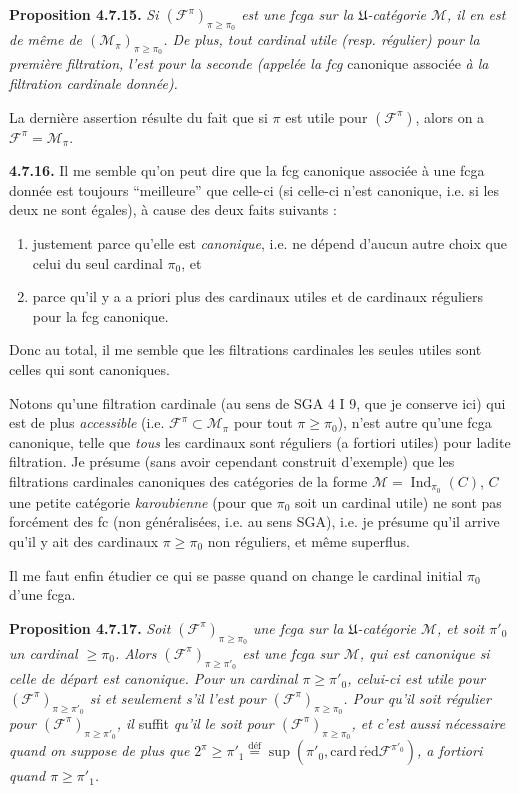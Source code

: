 \documentclass[11pt]{article}
\newcommand{\printedpage}[1]{\marginpar{\footnotesize p.~#1}}
\newcommand{\msp}[1]{\marginpar{\footnotesize [#1]}}
\newcommand{\Ind}{\operatorname{Ind}}
\newcommand{\cardred}{\operatorname{card\,r\acute{e}d}}
\begin{document}
\textbf{Proposition 4.7.15.} \textit{Si $(\mathcal{F}^{\pi})_{\pi\geqslant\pi_0}$ est une fcga sur la $\mathfrak{U}$-catégorie $\mathcal{M}$, il en est de même de $(\mathcal{M}_\pi)_{\pi\geqslant\pi_0}$. De plus, tout cardinal utile (resp. régulier) pour la première filtration, l'est pour la seconde (appelée la fcg} canonique associée \textit{à la filtration cardinale} \textit{donnée).}

La dernière assertion résulte du fait que si $\pi$ est utile pour $(\mathcal{F}^{\pi})$, alors on a $\mathcal{F}^{\pi}=\mathcal{M}_\pi$.

\textbf{4.7.16.} Il me semble qu'on peut dire que la fcg canonique associée à une fcga donnée
\msp{page 181}
est toujours ``meilleure'' que celle-ci (si celle-ci n'est canonique, i.e. si les deux ne sont égales), à cause des deux faits suivants :
\begin{enumerate}[label=\alph*)]
\item justement parce qu'elle est \textit{canonique}, i.e. ne dépend d'aucun autre choix que celui du seul cardinal $\pi_0$, et
\item parce qu'il y a a priori plus des cardinaux utiles et de cardinaux réguliers pour la fcg canonique.
\end{enumerate}
Donc au total, il me semble que les filtrations cardinales les seules utiles sont celles qui sont canoniques.

\noindent\printedpage{62}
Notons qu'une filtration cardinale (au sens de SGA 4 I 9, que je conserve ici) qui est de plus \textit{accessible} (i.e. $\mathcal{F}^{\pi}\subset\mathcal{M}_\pi$ pour tout $\pi\geqslant\pi_0$), n'est autre qu'une fcga canonique, telle que \textit{tous} les cardinaux sont réguliers (a fortiori utiles) pour ladite filtration. Je présume (sans avoir cependant construit d'exemple) que les filtrations cardinales canoniques des catégories de la forme $\mathcal{M}=\Ind_{\pi_0}(C)$, $C$ une petite catégorie \textit{karoubienne} (pour que $\pi_0$ soit un cardinal utile) ne sont pas forcément des fc (non généralisées, i.e. au sens SGA), i.e. je présume qu'il arrive qu'il y ait des cardinaux $\pi\geqslant\pi_0$ non réguliers, et même superflus.

\noindent\msp{page 182}Il me faut enfin étudier ce qui se passe quand on change le cardinal initial $\pi_0$ d'une fcga.

\textbf{Proposition 4.7.17.} \textit{Soit $(\mathcal{F}^{\pi})_{\pi\geqslant\pi_0}$ une fcga sur la $\mathfrak{U}$-catégorie $\mathcal{M}$, et soit $\pi'_0$ un cardinal $\geqslant\pi_0$. Alors $(\mathcal{F}^{\pi})_{\pi\geqslant\pi'_0}$ est une fcga sur $\mathcal{M}$, qui est canonique si celle de départ est canonique. Pour un cardinal $\pi\geqslant\pi'_0$, celui-ci est utile pour $(\mathcal{F}^{\pi})_{\pi\geqslant\pi'_0}$ si et seulement s'il l'est pour $(\mathcal{F}^{\pi})_{\pi\geqslant\pi_0}$. Pour qu'il soit régulier pour $(\mathcal{F}^{\pi})_{\pi\geqslant\pi'_0}$, il} suffit \textit{qu'il le soit pour $(\mathcal{F}^{\pi})_{\pi\geqslant\pi_0}$, et c'est aussi nécessaire quand on suppose de plus que $2^{\pi}\geqslant\pi'_1\overset{\text{déf}}{=}\sup(\pi'_0,\cardred\mathcal{F}^{\pi'_0})$, a fortiori quand $\pi\geqslant\pi'_1$.}
\end{document}
